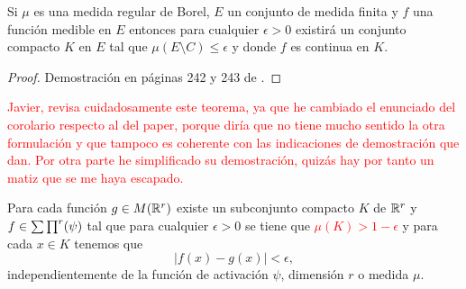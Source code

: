 \begin{teorema} \label{teo:Lusin}
    Si $\mu$ es una medida regular de Borel, $E$ un conjunto de medida finita 
    y $f$ una función medible en $E$ entonces
    para cualquier $\epsilon > 0$ existirá un conjunto compacto 
    $K$ en $E$ tal que $\mu(E \setminus C) \leq \epsilon$ y donde $f$ es continua en $K$. 
\end{teorema}
\begin{proof}
    Demostración en páginas 242 y 243 de \cite{nla.cat-vn1819421}.
\end{proof}

\textcolor{red}{Javier, revisa cuidadosamente este teorema, ya que he cambiado el enunciado del corolario respecto al del paper, porque 
diría que no tiene mucho sentido la otra formulación y 
 que tampoco es coherente con las indicaciones de demostración
 que dan.
 Por otra parte he simplificado su demostración, quizás 
 hay por tanto un matiz que se me haya escapado. 
 }
\begin{corolario} \label{cor:2_1}
    Para cada función $g \in M(\mathbb{R}^r)$ existe un subconjunto compacto 
    $K$ de $\mathbb{R}^r$ y $f \in \sum \prod^r (\psi)$ tal que para cualquier 
    $\epsilon > 0$ se tiene que 
    \textcolor{red}{$\mu(K) > 1- \epsilon$} y para cada $x \in K$ tenemos que 
    \begin{equation}
        |f(x) - g(x) | < \epsilon,
    \end{equation}
    independientemente de la función de activación $\psi$, dimensión $r$ o medida $\mu$. 
\end{corolario}
